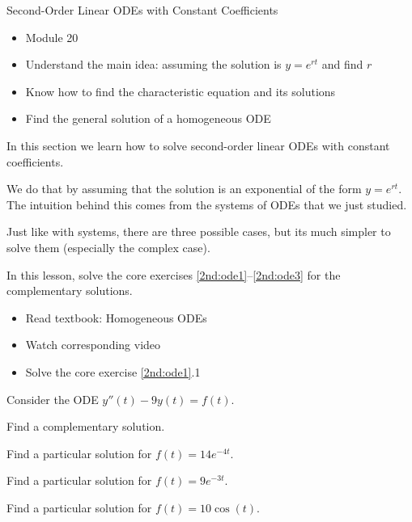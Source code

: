 \begin{module}{Second-Order Linear ODEs with Constant Coefficients}
	\label{2nd:solving}

	
	
\end{module}



\begin{lesson}

	\begin{itemize}
		\item Module 20
	\end{itemize}

	\begin{itemize}
		\item Understand the main idea: assuming the solution is $y=e^{rt}$ and find $r$
		\item Know how to find the characteristic equation and its solutions
		\item Find the general solution of a homogeneous ODE
	\end{itemize}
	


In this section we learn how to solve second-order linear ODEs with constant coefficients.

We do that by assuming that the solution is an exponential of the form $y=e^{rt}$. The intuition behind this comes from the systems of ODEs that we just studied.

Just like with systems, there are three possible cases, but its much simpler to solve them (especially the complex case).

In this lesson, solve the core exercises \ref{2nd:ode1}--\ref{2nd:ode3} for the complementary solutions.

\begin{itemize}
	\item Read textbook: Homogeneous ODEs
	\item Watch corresponding video
	\item Solve the core exercise \ref{2nd:ode1}.1
\end{itemize}

\end{lesson}




\question \label{2nd:ode1}
	Consider the ODE \quad $y''(t) -9y(t) = f(t)$.
\begin{parts}
	\item Find a complementary solution.
	\item Find a particular solution for $f(t) = 14 e^{-4t}$.
	\item Find a particular solution for $f(t) = 9 e^{-3t}$.
	\item Find a particular solution for $f(t) = 10\cos(t)$.
\end{parts}

